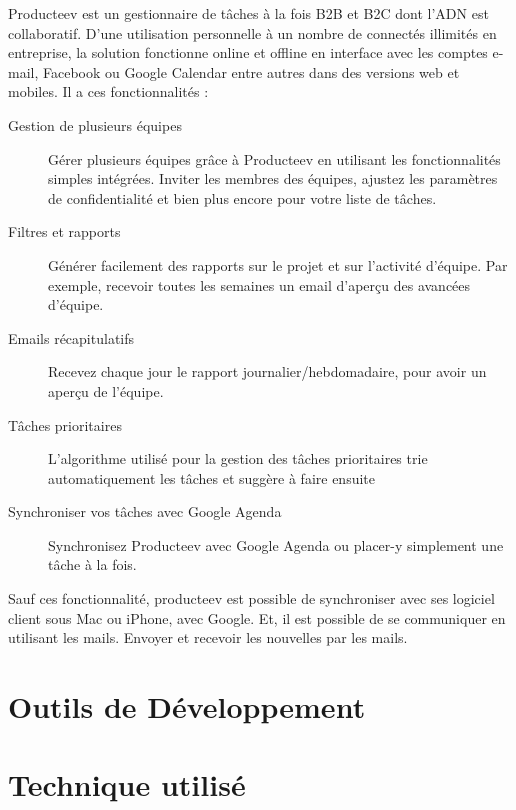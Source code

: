 Producteev est un gestionnaire de tâches à la fois B2B et B2C dont l’ADN est collaboratif. D’une utilisation personnelle à un nombre de connectés illimités en entreprise, la solution fonctionne online et offline en interface avec les comptes e-mail, Facebook ou Google Calendar entre autres dans des versions web et mobiles. Il a ces fonctionnalités :
\begin{description}
	\item[Gestion de plusieurs équipes] Gérer plusieurs équipes grâce à Producteev en utilisant les fonctionnalités simples intégrées. Inviter les membres des équipes, ajustez les paramètres de confidentialité et bien plus encore pour votre liste de tâches.
	\item[Filtres et rapports] Générer facilement des rapports sur le projet et sur l'activité d'équipe. Par exemple, recevoir toutes les semaines un email d'aperçu des avancées d'équipe.
	\item[Emails récapitulatifs] Recevez chaque jour le rapport journalier/hebdomadaire, pour avoir un aperçu de l'équipe.
	\item[Tâches prioritaires]  L'algorithme utilisé pour la gestion des tâches prioritaires trie automatiquement les tâches et  suggère à faire ensuite
	\item[Synchroniser vos tâches avec Google Agenda] Synchronisez Producteev avec Google Agenda ou placer-y simplement une tâche à la fois. 
\end{description}

Sauf ces fonctionnalité, producteev est possible de synchroniser avec ses logiciel client sous Mac ou iPhone, avec Google. Et, il est possible de se communiquer en utilisant les mails. Envoyer et recevoir les nouvelles par les mails. 





\section{Outils de Développement} %
\label{sec:outils_de_développement}


\section{Technique utilisé} %
\label{sec:technique_utilisé}



